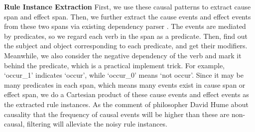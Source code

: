 



\textbf{Rule Instance Extraction}
First, we use these causal patterns to extract cause span and effect span. Then, we further extract the cause events and effect events from these two spans via existing dependency parser \cite{Manning}.
The events are mediated by predicates, so we regard each verb in the span as a predicate. Then, find out the subject and object corresponding to each predicate, and get their modifiers. Meanwhile, we also consider the negative dependency of the verb and mark it behind the predicate, which is a practical implement trick. For example, `occur\_1' indicates `occur', while `occur\_0' means `not occur'. 
Since it may be many predicates in each span, which means many events exist in cause span or effect span, we do a Cartesian product of these cause events and effect events as the extracted rule instances. As the comment of philosopher David Hume about causality that the frequency of causal events will be higher than these are non-causal, filtering will alleviate the noisy rule instances. 

